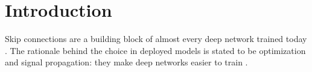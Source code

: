\documentclass[10pt]{article}
\theoremstyle{definition}
\theoremstyle{remark}
\newcommand{\dm}{d_{\mathrm{model}}}
\begin{document}
\begin{abstract}
\end{abstract}

\tableofcontents

\section{Introduction}\label{sec:intro}

Skip connections are a building block of almost every deep network trained today \citep{he2016resnet}. The rationale behind the choice in deployed models is stated to be optimization and signal propagation: they make deep networks easier to train \citep{he2016resnet,balduzzi2017shattered,orhan2018skip,macdonald2023skip}.
\end{document}
